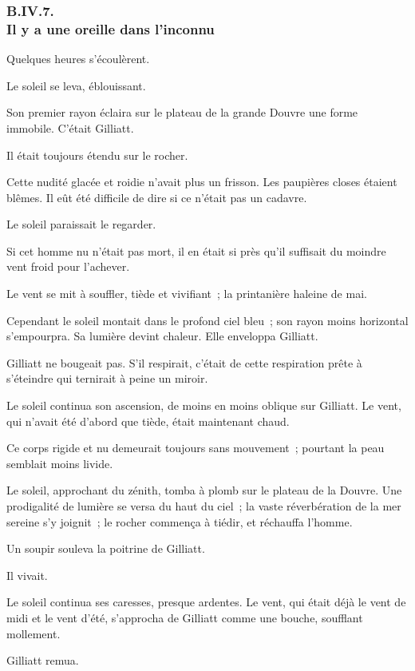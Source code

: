 \documentclass[french,twoside]{book} %
\begin{document}
 \subsubsection[{B.IV.7. Il y a une oreille dans l’inconnu}]{B.IV.7. \\
Il y a une oreille dans l’inconnu}
\noindent Quelques heures s’écoulèrent.\par
Le soleil se leva, éblouissant.\par
Son premier rayon éclaira sur le plateau de la grande Douvre une forme immobile. C’était Gilliatt.\par
Il était toujours étendu sur le rocher.\par
Cette nudité glacée et roidie n’avait plus un frisson. Les paupières closes étaient blêmes. Il eût été difficile de dire si ce n’était pas un cadavre.\par
Le soleil paraissait le regarder.\par
Si cet homme nu n’était pas mort, il en était si près qu’il suffisait du moindre vent froid pour l’achever.\par
Le vent se mit à souffler, tiède et vivifiant ; la printanière haleine de mai.\par
Cependant le soleil montait dans le profond ciel bleu ; son rayon moins horizontal s’empourpra. Sa lumière devint chaleur. Elle enveloppa Gilliatt.\par
Gilliatt ne bougeait pas. S’il respirait, c’était de cette respiration prête à s’éteindre qui ternirait à peine un miroir.\par
 Le soleil continua son ascension, de moins en moins oblique sur Gilliatt. Le vent, qui n’avait été d’abord que tiède, était maintenant chaud.\par
Ce corps rigide et nu demeurait toujours sans mouvement ; pourtant la peau semblait moins livide.\par
Le soleil, approchant du zénith, tomba à plomb sur le plateau de la Douvre. Une prodigalité de lumière se versa du haut du ciel ; la vaste réverbération de la mer sereine s’y joignit ; le rocher commença à tiédir, et réchauffa l’homme.\par
Un soupir souleva la poitrine de Gilliatt.\par
Il vivait.\par
Le soleil continua ses caresses, presque ardentes. Le vent, qui était déjà le vent de midi et le vent d’été, s’approcha de Gilliatt comme une bouche, soufflant mollement.\par
Gilliatt remua.\par
\end{document}
